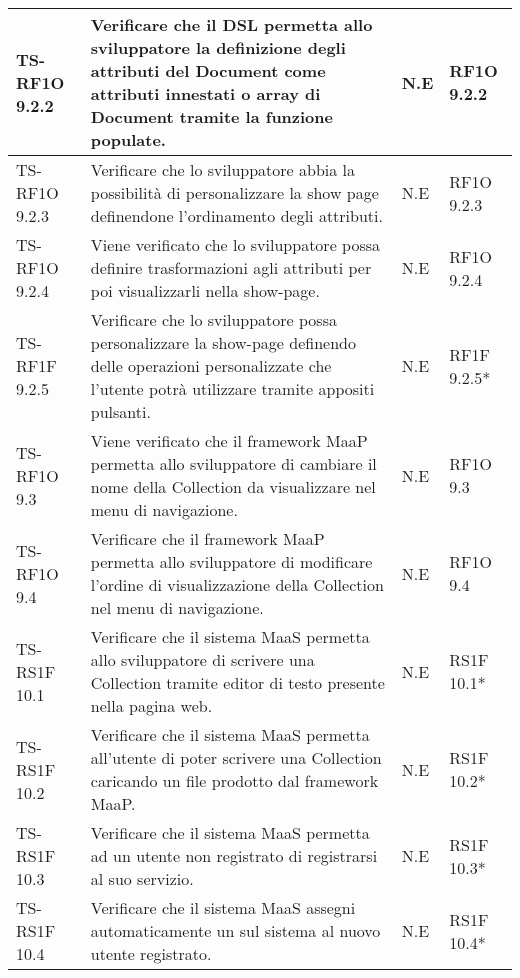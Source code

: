 \begin{center}
\begin{longtable}{| p{3cm} | p{6cm} | p{1.5cm} | p{2cm} | }
				TS-RF1O 9.2.2 & 
				Verificare che il DSL permetta allo sviluppatore la definizione degli attributi del Document come attributi innestati o array di Document tramite la funzione populate. & N.E & RF1O 9.2.2 \newline  \\ \hline 
				TS-RF1O 9.2.3 & 
				Verificare che lo sviluppatore abbia la possibilità di personalizzare la show page definendone l’ordinamento degli attributi. & N.E & RF1O 9.2.3 \newline  \\ \hline 
				TS-RF1O 9.2.4 & 
				Viene verificato che lo sviluppatore possa definire trasformazioni agli attributi per poi visualizzarli nella show-page. & N.E & RF1O 9.2.4 \newline  \\ \hline 
				TS-RF1F 9.2.5 & 
				Verificare che lo sviluppatore possa personalizzare la show-page definendo delle operazioni personalizzate che l’utente potrà utilizzare tramite appositi pulsanti. & N.E & RF1F 9.2.5*  \newline  \\ \hline 
				TS-RF1O 9.3 & 
				Viene verificato che il framework MaaP permetta allo sviluppatore di cambiare il nome della Collection da visualizzare nel menu di navigazione. & N.E & RF1O 9.3 \newline  \\ \hline 
				TS-RF1O 9.4 & 
				Verificare che il framework MaaP permetta allo sviluppatore di modificare l’ordine di visualizzazione della Collection nel menu di navigazione. & N.E & RF1O 9.4 \newline  \\ \hline 
				TS-RS1F 10.1 & 
				Verificare che il sistema MaaS permetta allo sviluppatore di scrivere una Collection tramite editor di testo presente nella pagina web. & N.E & RS1F 10.1*  \newline  \\ \hline 
				TS-RS1F 10.2 & 
				Verificare che il sistema MaaS permetta all'utente di poter scrivere una Collection caricando un file prodotto dal framework MaaP. & N.E & RS1F 10.2*  \newline  \\ \hline 
				TS-RS1F 10.3 & 
				Verificare che il sistema MaaS permetta ad un utente non registrato di registrarsi al suo servizio. & N.E & RS1F 10.3*  \newline  \\ \hline 
				TS-RS1F 10.4 & 
				Verificare che il sistema MaaS assegni automaticamente un \glossario{namespace} sul sistema al nuovo utente registrato. & N.E & RS1F 10.4*  \newline  \\ \hline 

\end{longtable}
\end{center}

